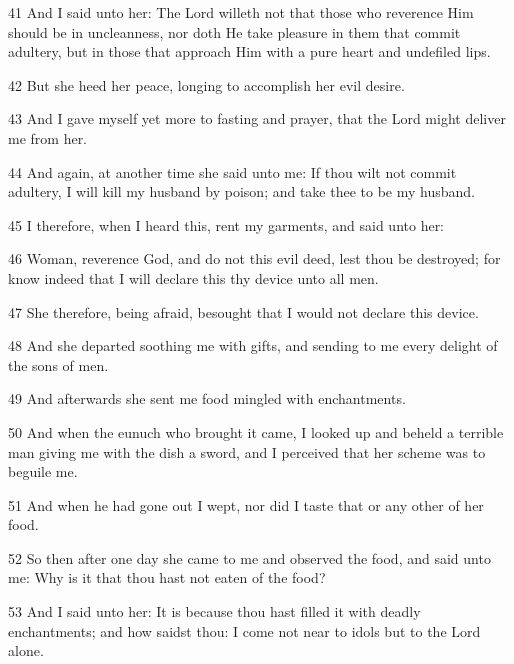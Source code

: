 \par 41 And I said unto her: The Lord willeth not that those who reverence Him should be in uncleanness, nor doth He take pleasure in them that commit adultery, but in those that approach Him with a pure heart and undefiled lips.

\par 42 But she heed her peace, longing to accomplish her evil desire.

\par 43 And I gave myself yet more to fasting and prayer, that the Lord might deliver me from her.

\par 44 And again, at another time she said unto me: If thou wilt not commit adultery, I will kill my husband by poison; and take thee to be my husband.

\par 45 I therefore, when I heard this, rent my garments, and said unto her:

\par 46 Woman, reverence God, and do not this evil deed, lest thou be destroyed; for know indeed that I will declare this thy device unto all men.

\par 47 She therefore, being afraid, besought that I would not declare this device.

\par 48 And she departed soothing me with gifts, and sending to me every delight of the sons of men.

\par 49 And afterwards she sent me food mingled with enchantments.

\par 50 And when the eunuch who brought it came, I looked up and beheld a terrible man giving me with the dish a sword, and I perceived that her scheme was to beguile me.

\par 51 And when he had gone out I wept, nor did I taste that or any other of her food.

\par 52 So then after one day she came to me and observed the food, and said unto me: Why is it that thou hast not eaten of the food?

\par 53 And I said unto her: It is because thou hast filled it with deadly enchantments; and how saidst thou: I come not near to idols but to the Lord alone.

